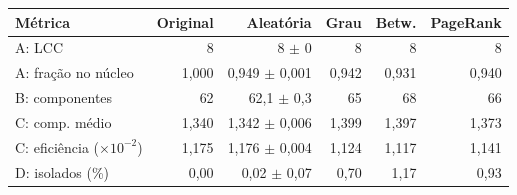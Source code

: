 \begin{tabular}{lrrrrr}
  \toprule
  Métrica & Original & Aleatória & Grau & Betw. & PageRank \\
  \midrule
  A: LCC & 8 & 8 $\pm$ 0 & 8 & 8 & 8 \\
  A: fração no núcleo & 1,000 & 0,949 $\pm$ 0,001 & 0,942 & 0,931 & 0,940 \\
  B: componentes & 62 & 62,1 $\pm$ 0,3 & 65 & 68 & 66 \\
  C: comp. médio & 1,340 & 1,342 $\pm$ 0,006 & 1,399 & 1,397 & 1,373 \\
  C: eficiência ($\times 10^{-2}$) & 1,175 & 1,176 $\pm$ 0,004 & 1,124 & 1,117 & 1,141 \\
  D: isolados (\%) & 0,00 & 0,02 $\pm$ 0,07 & 0,70 & 1,17 & 0,93 \\
  \bottomrule
\end{tabular}
